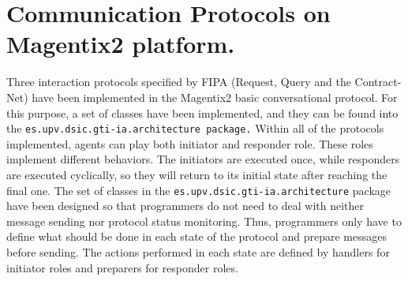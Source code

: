 




\section{Communication Protocols on Magentix2 platform.}
Three interaction protocols specified by FIPA (Request, Query and the Contract-Net) have been implemented in the Magentix2 basic conversational protocol. For this purpose, a set of classes have been implemented, and they can be found into the \lstinline|es.upv.dsic.gti-ia.architecture package.|
Within all of the protocols implemented, agents can play both initiator and responder role. These roles implement different behaviors. The initiators  are executed once, while responders are executed cyclically, so they will return to its initial state after reaching the final one.
The set of classes in the \lstinline|es.upv.dsic.gti-ia.architecture| package have been designed so that programmers do not need to deal with neither message sending nor protocol status monitoring. Thus, programmers only have to define what should be done in each state of the protocol and prepare messages before sending. The actions performed in each state are defined by handlers for initiator roles and preparers for responder roles.

